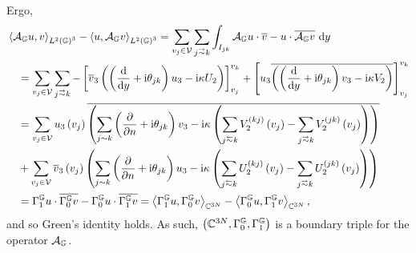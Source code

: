 \documentclass[11pt]{report}
\newcommand{\dgmap}{\dmap^{\graph}}
\newcommand{\ngmap}{\nmap^{\graph}}
\newcommand{\ag}{\mathcal{A}_\graph}
\newcommand{\ip}[2]{\left\langle #1 , #2 \right\rangle}
\begin{document}
Ergo,
\begin{align*}
	&\ip{\ag u}{v}_{L^2\bracs{\graph}^3} - \ip{u}{\ag v}_{L^2\bracs{\graph}^3}
	= \sum_{v_j\in\vertSet}\sum_{j\conLeft k} \integral{I_{jk}}{ \ag u \cdot \overline{v} - u \cdot \overline{\ag v} }{y} \\
	&\quad = \sum_{v_j\in\vertSet}\sum_{j\conLeft k} -\sqbracs{ \overline{v}_3\bracs{ \bracs{\diff{}{y} + \rmi\qm_{jk} }u_3 - \rmi\wavenumber U_2 } }_{v_j}^{v_k}
	+ \sqbracs{ u_3\overline{\bracs{ \bracs{\diff{}{y} + \rmi\qm_{jk} }v_3 - \rmi\wavenumber V_2 }} }_{v_j}^{v_k} \\
	&\quad = \sum_{v_j\in\vertSet} u_3\bracs{v_j}\overline{\bracs{ \sum_{j\con k}\bracs{\pdiff{}{n} + \rmi\qm_{jk}}v_3 - \rmi\wavenumber\bracs{ \sum_{j\conRight k} V_2^{(kj)}\bracs{v_j} - \sum_{j\conLeft k} V_2^{(jk)}\bracs{v_j} } }} \\
	&\quad + \sum_{v_j\in\vertSet} \overline{v}_3\bracs{v_j}\bracs{ \sum_{j\con k}\bracs{\pdiff{}{n} + \rmi\qm_{jk}}u_3 - \rmi\wavenumber\bracs{ \sum_{j\conRight k} U_2^{(kj)}\bracs{v_j} - \sum_{j\conLeft k} U_2^{(jk)}\bracs{v_j} } } \\
	&\quad = \ngmap u \cdot \overline{\dgmap v} - \dgmap u \cdot \overline{\ngmap v}
	= \ip{\ngmap u}{\dgmap v}_{\complex^{3N}} - \ip{\dgmap u}{\ngmap v}_{\complex^{3N}},
\end{align*}
and so Green's identity holds.
As such, $\bracs{\complex^{3N}, \dgmap, \ngmap}$ is a boundary triple for the operator $\ag$.
\end{document}
